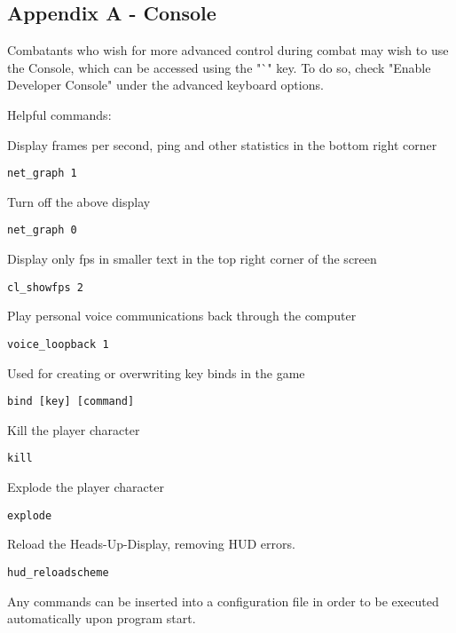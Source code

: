 \subsection{Appendix A - Console}
Combatants who wish for more advanced control during combat may wish to use the Console, which can be accessed using the "`" key. To do so, check "Enable Developer Console" under the advanced keyboard options.

Helpful commands:

Display frames per second, ping and other statistics in the bottom right corner
\begin{lstlisting}
net_graph 1
\end{lstlisting}

Turn off the above display
\begin{lstlisting}   
net_graph 0
\end{lstlisting}

Display only fps in smaller text in the top right corner of the screen
\begin{lstlisting}
cl_showfps 2
\end{lstlisting}

Play personal voice communications back through the computer
\begin{lstlisting}
voice_loopback 1
\end{lstlisting}

Used for creating or overwriting key binds in the game
\begin{lstlisting}
bind [key] [command]
\end{lstlisting}

Kill the player character
\begin{lstlisting}
kill
\end{lstlisting}

Explode the player character
\begin{lstlisting}
explode
\end{lstlisting}

Reload the Heads-Up-Display, removing HUD errors.
\begin{lstlisting}
hud_reloadscheme
\end{lstlisting}
 
Any commands can be inserted into a configuration file in order to be executed automatically upon program start.
